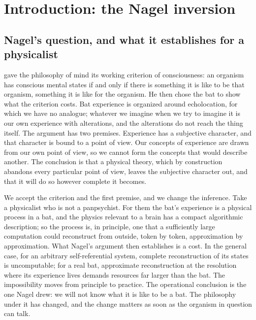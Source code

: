 \section{Introduction: the Nagel inversion}
\label{sec:intro}

\subsection{Nagel's question, and what it establishes for a physicalist}

\citet{nagel1974} gave the philosophy of mind its working criterion of consciousness: an organism has
conscious mental states if and only if there is something it is like to be that organism, something it
is like for the organism. He then chose the bat to show what the criterion costs. Bat experience is
organized around echolocation, for which we have no analogue; whatever we imagine when we try to
imagine it is our own experience with alterations, and the alterations do not reach the thing itself.
The argument has two premises. Experience has a subjective character, and that character is bound to a
point of view. Our concepts of experience are drawn from our own point of view, so we cannot form the
concepts that would describe another. The conclusion is that a physical theory, which by construction
abandons every particular point of view, leaves the subjective character out, and that it will do so
however complete it becomes.

We accept the criterion and the first premise, and we change the inference. Take a physicalist who is
not a panpsychist. For them the bat's experience is a physical process in a bat, and the physics
relevant to a brain has a compact algorithmic description; so the process is, in principle, one that
a sufficiently large computation could reconstruct from outside, token by token, approximation by
approximation. What Nagel's argument then establishes is a cost. In the general case, for an
arbitrary self-referential system, complete reconstruction of its states is uncomputable; for a real
bat, approximate reconstruction at the resolution where its experience lives demands resources far
larger than the bat. The impossibility moves from principle to practice. The operational conclusion is
the one Nagel drew: we will not know what it is like to be a bat. The philosophy under it has
changed, and the change matters as soon as the organism in question can talk.

